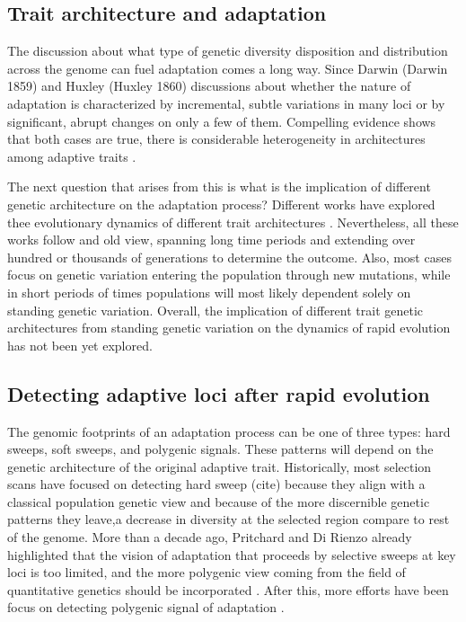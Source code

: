 \documentclass{article}
\begin{document}
\subsection{Trait architecture and adaptation}
The discussion about what type of genetic diversity disposition and distribution across the genome can fuel adaptation comes a long way. Since Darwin (Darwin 1859) and Huxley (Huxley 1860) discussions about whether the nature of adaptation is characterized by incremental, subtle variations in many loci or by significant, abrupt changes on only a few of them. Compelling evidence shows that both cases are true, there is considerable heterogeneity in architectures among adaptive traits \citep{Orr1992-xj, Orr1998-pr}. 

The next question that arises from this is what is the implication of different genetic architecture on the adaptation process? Different works have explored thee evolutionary dynamics of different trait architectures \citep{Hayward2021-ji, Stetter2018-st, Thornton2019-ww}. Nevertheless, all these works follow and old view, spanning long time periods and extending over hundred or thousands of generations to determine the outcome. Also, most cases focus on genetic variation entering the population through new mutations, while in short periods of times populations will most likely dependent solely on standing genetic variation. Overall, the implication of different trait genetic architectures from standing genetic variation on the dynamics of rapid evolution has not been yet explored. 

\subsection{Detecting adaptive loci after rapid evolution}
The genomic footprints of an adaptation process can be one of three types: hard sweeps, soft sweeps, and polygenic signals. These patterns will depend on the genetic architecture of the original adaptive trait. Historically, most selection scans have focused on detecting hard sweep (cite) because they align with a classical population genetic view and because of the more discernible genetic patterns they leave,a decrease in diversity at the selected region compare to rest of the genome. More than a decade ago, Pritchard and Di Rienzo already highlighted that the vision of adaptation that proceeds by selective sweeps at key loci is too limited, and the more polygenic view coming from the field of quantitative genetics should be incorporated \citep{Pritchard2010-bv}. After this, more efforts have been focus on detecting polygenic signal of adaptation \citep{Berg2014-zl}.
\end{document}
